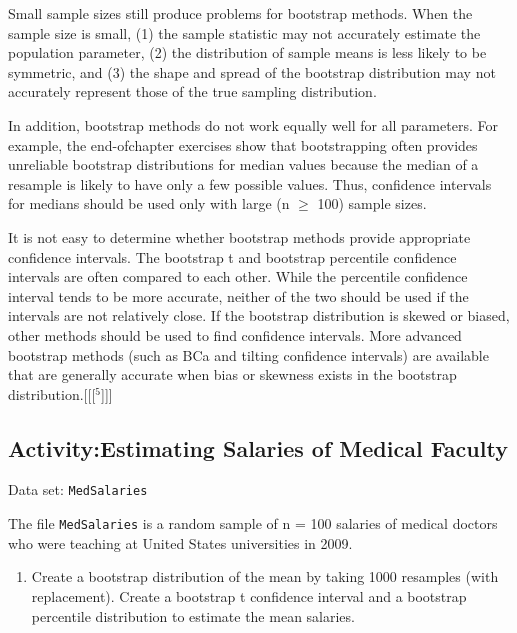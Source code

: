 \documentclass[
]{book}
\providecommand{\tightlist}{%
  \setlength{\itemsep}{0pt}\setlength{\parskip}{0pt}}
\begin{document}
Small sample sizes still produce problems for bootstrap methods. When the sample size is small, (1) the sample statistic may not accurately estimate the population parameter, (2) the distribution of sample means is less likely to be symmetric, and (3) the shape and spread of the bootstrap distribution may not accurately represent those of the true sampling distribution.

In addition, bootstrap methods do not work equally well for all parameters. For example, the end-ofchapter exercises show that bootstrapping often provides unreliable bootstrap distributions for median values because the median of a resample is likely to have only a few possible values. Thus, confidence intervals for medians should be used only with large (n \(\geq\) 100) sample sizes.

It is not easy to determine whether bootstrap methods provide appropriate confidence intervals. The bootstrap t and bootstrap percentile confidence intervals are often compared to each other. While the percentile confidence interval tends to be more accurate, neither of the two should be used if the intervals are not relatively
close. If the bootstrap distribution is skewed or biased, other methods should be used to find confidence intervals. More advanced bootstrap methods (such as BCa and tilting confidence intervals) are available that are generally accurate when bias or skewness exists in the bootstrap distribution.{[}{[}{[}\(^5\){]}{]}{]}

\hypertarget{activityestimating-salaries-of-medical-faculty}{%
\subsection*{Activity:Estimating Salaries of Medical Faculty}\label{activityestimating-salaries-of-medical-faculty}}

Data set: \texttt{MedSalaries}

The file \texttt{MedSalaries} is a random sample of n = 100 salaries of medical doctors who were teaching at United States universities in 2009.

\begin{enumerate}
\def\labelenumi{\arabic{enumi}.}
\setcounter{enumi}{23}
\tightlist
\item
  Create a bootstrap distribution of the mean by taking 1000 resamples (with replacement). Create a bootstrap t confidence interval and a bootstrap percentile distribution to estimate the mean salaries.
\end{enumerate}
\end{document}
